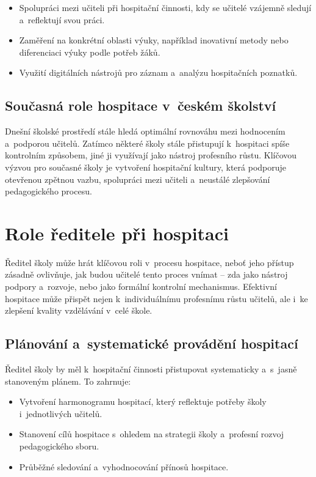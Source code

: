 \begin{itemize}
    \item Spolupráci mezi učiteli při hospitační činnosti, kdy se učitelé vzájemně sledují a~reflektují svou práci.

    \item Zaměření na konkrétní oblasti výuky, například inovativní metody nebo diferenciaci výuky podle potřeb žáků.

    \item Využití digitálních nástrojů pro záznam a~analýzu hospitačních poznatků.
\end{itemize}

\subsection{Současná role hospitace v~českém školství}

Dnešní školské prostředí stále hledá optimální rovnováhu mezi hodnocením a~podporou učitelů. Zatímco některé školy stále přistupují k~hospitaci spíše kontrolním způsobem, jiné ji využívají jako nástroj profesního růstu. Klíčovou výzvou pro současné školy je vytvoření hospitační kultury, která podporuje otevřenou zpětnou vazbu, spolupráci mezi učiteli a~neustálé zlepšování pedagogického procesu.


\section{Role ředitele při hospitaci}

Ředitel školy může hrát klíčovou roli v~procesu hospitace, neboť jeho přístup zásadně ovlivňuje, jak budou učitelé tento proces vnímat – zda jako nástroj podpory a~rozvoje, nebo jako formální kontrolní mechanismus. Efektivní hospitace může přispět nejen k~individuálnímu profesnímu růstu učitelů, ale i~ke zlepšení kvality vzdělávání v~celé škole.

\subsection{Plánování a~systematické provádění hospitací}
Ředitel školy by měl k~hospitační činnosti přistupovat systematicky a~s~jasně stanoveným plánem. To zahrnuje:

\begin{itemize}
    \item Vytvoření harmonogramu hospitací, který reflektuje potřeby školy i~jednotlivých učitelů.
    \item Stanovení cílů hospitace s~ohledem na strategii školy a~profesní rozvoj pedagogického sboru.
    \item Průběžné sledování a~vyhodnocování přínosů hospitace.
\end{itemize}

